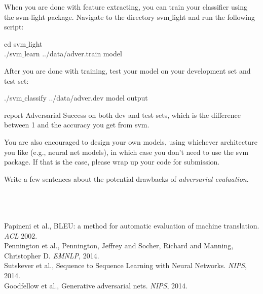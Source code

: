 \documentclass{article}
\begin{document}
When you are done with  feature extracting, you can train your classifier using the svm-light package. 
Navigate to the directory svm$\_$light and run the following script:
\begin{center}
cd svm$\_$light \\
./svm$\_$learn ../data/adver.train model \\
\end{center} 
After you are done with training, test your model on your development set and test set:
\begin{center}
./svm$\_$classify ../data/adver.dev model output
\end{center} 
report Adversarial Success on both dev and test sets, which is the difference between 1 and the accuracy you get from svm. 

You are also encouraged to design your own models, using whichever architecture you like (e.g., neural net models), in which case you don't need to use the svm package. 
If that is the case, please wrap up your code for submission. 

Write a few sentences about the potential drawbacks of {\it adversarial evaluation}. 


~~\\~~\\
\\
\noindent [1] Papineni et al., BLEU: a method for automatic evaluation of machine translation. {\it ACL} 2002. \\
\noindent [2] Pennington et al., Pennington, Jeffrey and Socher, Richard and Manning, Christopher D. {\it EMNLP}, 2014. \\
\noindent [3] Sutskever et al., Sequence to Sequence Learning
with Neural Networks. {\it NIPS}, 2014. \\ 
\noindent [4] Goodfellow et al., Generative adversarial nets. {\it NIPS}, 2014. 
\end{document}
